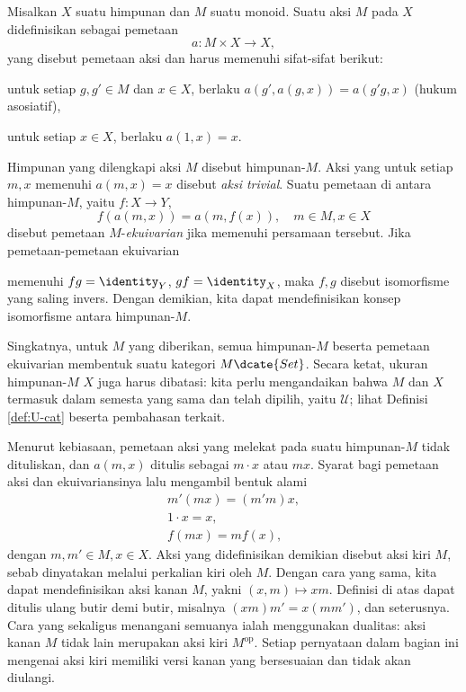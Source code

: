 \begin{definition}\label{def:monoid-action} 
	Misalkan $X$ suatu himpunan dan $M$ suatu monoid. Suatu aksi $M$ pada $X$ didefinisikan sebagai pemetaan
	\[ a: M \times X \to X, \]
	yang disebut pemetaan aksi dan harus memenuhi sifat-sifat berikut:
	\begin{compactenum}[(i)]
		\item untuk setiap $g,g' \in M$ dan $x \in X$, berlaku $a(g', a(g, x)) = a(g'g, x)$ (hukum asosiatif),
		\item untuk setiap $x \in X$, berlaku $a(1, x)=x$.
	\end{compactenum}
	Himpunan yang dilengkapi aksi $M$ disebut himpunan-$M$. Aksi yang untuk setiap $m,x$ memenuhi $a(m,x)=x$ disebut \emph{aksi trivial}. Suatu pemetaan di antara himpunan-$M$, yaitu $f: X \to Y$,
	\[ f(a(m, x)) = a(m, f(x)), \quad m \in M, x \in X \]
	disebut pemetaan $M$-\emph{ekuivarian} jika memenuhi persamaan tersebut. Jika pemetaan-pemetaan ekuivarian
	memenuhi $fg = \identity_Y$, $gf = \identity_X$, maka $f, g$ disebut isomorfisme yang saling invers. Dengan demikian, kita dapat mendefinisikan konsep isomorfisme antara himpunan-$M$.
\end{definition}

\begin{remark}
	Singkatnya, untuk $M$ yang diberikan, semua himpunan-$M$ beserta pemetaan ekuivarian membentuk suatu kategori $M\dcate{Set}$. Secara ketat, ukuran himpunan-$M$ $X$ juga harus dibatasi: kita perlu mengandaikan bahwa $M$ dan $X$ termasuk dalam semesta yang sama dan telah dipilih, yaitu $\mathcal{U}$; lihat Definisi \ref{def:U-cat} beserta pembahasan terkait.
\end{remark}


Menurut kebiasaan, pemetaan aksi yang melekat pada suatu himpunan-$M$ tidak dituliskan, dan $a(m, x)$ ditulis sebagai $m \cdot x$ atau $mx$. Syarat bagi pemetaan aksi dan ekuivariansinya lalu mengambil bentuk alami
\begin{gather*}
	m'(mx) = (m'm)x, \\
	1 \cdot x = x, \\
	f(mx) = mf(x),
\end{gather*}
dengan $ m, m' \in M, x \in X$. Aksi yang didefinisikan demikian disebut aksi kiri $M$, sebab dinyatakan melalui perkalian kiri oleh $M$. Dengan cara yang sama, kita dapat mendefinisikan aksi kanan $M$, yakni $(x, m) \mapsto xm$. Definisi di atas dapat ditulis ulang butir demi butir, misalnya $(xm)m' = x(mm')$, dan seterusnya. Cara yang sekaligus menangani semuanya ialah menggunakan dualitas: aksi kanan $M$ tidak lain merupakan aksi kiri $M^\text{op}$. Setiap pernyataan dalam bagian ini mengenai aksi kiri memiliki versi kanan yang bersesuaian dan tidak akan diulangi.

